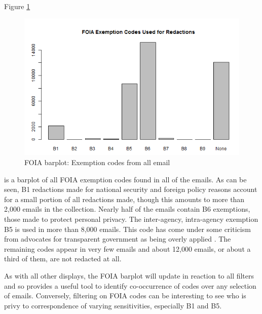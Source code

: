 \documentclass[journal]{vgtc}                %
\begin{document}
Figure \ref{fig:FOIAcodes}
\begin{figure}[h]
\begin{center}
\includegraphics[width=0.95\linewidth]{ExemptionsFullTime}
\caption{FOIA barplot: Exemption codes from all email}
\label{fig:FOIAcodes}
\end{center}
\end{figure}
is a barplot of all FOIA exemption codes found in all of the emails.  As can be seen, B1 redactions made for national security and foreign policy reasons account for a small portion of all redactions made,  though this amounts to more than 2,000 emails in the collection.   Nearly half of the emails contain B6 exemptions, those made to protect personal privacy.   The inter-agency, intra-agency exemption B5 is used in more than 8,000 emails.  This code has come under some criticism from advocates for transparent government as being overly applied \cite{unredactedB5}.  The remaining codes appear in very few emails and about 12,000 emails, or about a third of them, are not redacted at all.

As with all other displays, the FOIA barplot will update in reaction to all filters and so provides a useful tool to identify co-occurrence of codes over any selection of emails.  Conversely, filtering on FOIA codes can be interesting to see who is privy to correspondence of varying sensitivities, especially B1 and B5.
\end{document}
